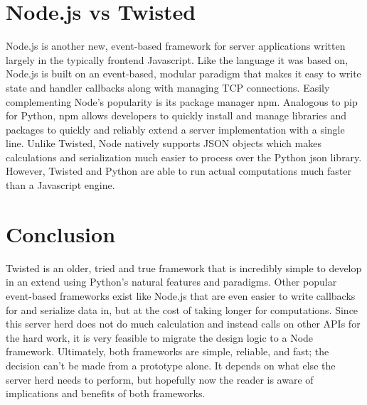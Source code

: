 \documentclass[letterpaper,twocolumn,10pt]{article}
\begin{document}
\section{Node.js vs Twisted}
Node.js is another new, event-based framework for server applications written largely in the typically frontend Javascript. Like the language it was based on, Node.js is built on an event-based, modular paradigm that makes it easy to write state and handler callbacks along with managing TCP connections. Easily complementing Node's popularity is its package manager npm. Analogous to pip for Python, npm allows developers to quickly install and manage libraries and packages to quickly and reliably extend a server implementation with a single line. Unlike Twisted, Node natively supports JSON objects which makes calculations and serialization much easier to process over the Python json library. However, Twisted and Python are able to run actual computations much faster than a Javascript engine.

\section{Conclusion}
Twisted is an older, tried and true framework that is incredibly simple to develop in an extend using Python's natural features and paradigms. Other popular event-based frameworks exist like Node.js that are even easier to write callbacks for and serialize data in, but at the cost of taking longer for computations. Since this server herd does not do much calculation and instead calls on other APIs for the hard work, it is very feasible to migrate the design logic to a Node framework. Ultimately, both frameworks are simple, reliable, and fast; the decision can't be made from a prototype alone. It depends on what else the server herd needs to perform, but hopefully now the reader is aware of implications and benefits of both frameworks.
\end{document}
